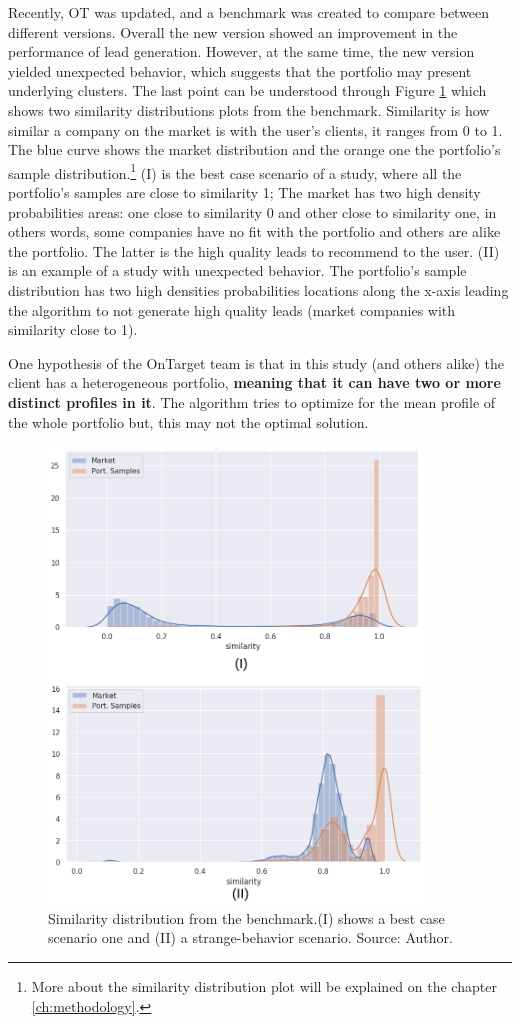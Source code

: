 Recently, OT was updated, and a benchmark was created to compare between different versions. Overall the new version showed an improvement in the performance of lead generation. However, at the same time, the new version yielded unexpected behavior, which suggests that the portfolio may present underlying clusters. The last point can be understood through Figure \ref{fig:simi-dist-expected-real} which shows two similarity distributions plots from the benchmark. Similarity is how similar a company on the market is with the user's clients, it ranges from 0 to 1. The blue curve shows the market distribution and the orange one the portfolio's sample distribution.\footnote{More about the similarity distribution plot will be explained on the chapter \ref{ch:methodology}.}
(I) is the best case scenario of a study, where all the portfolio's samples are close to similarity 1; The market has two high density probabilities areas: one close to similarity 0 and other close to similarity one, in others words, some companies have no fit with the portfolio and others are alike the portfolio. The latter is the high quality leads to recommend to the user. (II) is an example of a study with unexpected behavior. The portfolio's sample distribution has two high densities probabilities locations along the x-axis leading the algorithm to not generate high quality leads (market companies with similarity close to 1).

One hypothesis of the OnTarget team is that in this study (and others alike) the client has a heterogeneous portfolio, \textbf{meaning that it can have two or more distinct profiles in it}. The algorithm tries to optimize for the mean profile of the whole portfolio but, this may not the optimal solution.

\begin{figure}
   \centering
   \includegraphics[width=10cm]{fig/ch1-simi-dist-expected-real.png} 
   \caption{Similarity distribution from the benchmark.(I) shows a best case scenario one and (II) a strange-behavior scenario. Source: Author.}
   \label{fig:simi-dist-expected-real}
\end{figure}


